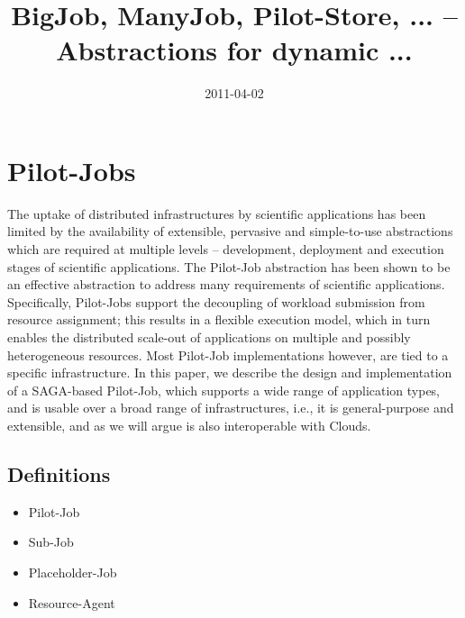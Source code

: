 \documentclass[]{article}
\title{BigJob, ManyJob, Pilot-Store, ... -- Abstractions for dynamic ...}
\author{  }
\date{2011-04-02}
\begin{document}
\ifpdf
{}
\else
{}
\fi

\maketitle


\section{Pilot-Jobs}

The uptake of distributed infrastructures by scientific applications has been
limited by the availability of extensible, pervasive and simple-to-use
abstractions which are required at multiple levels – development, deployment
and execution stages of scientific applications. The Pilot-Job abstraction has
been shown to be an effective abstraction to address many requirements of
scientific applications. Specifically, Pilot-Jobs support the decoupling of
workload submission from resource assignment; this results in a flexible
execution model, which in turn enables the distributed scale-out of
applications on multiple and possibly heterogeneous resources. Most Pilot-Job
implementations however, are tied to a specific infrastructure. In this paper,
we describe the design and implementation of a SAGA-based Pilot-Job, which
supports a wide range of application types, and is usable over a broad range
of infrastructures, i.e., it is general-purpose and extensible, and as we will
argue is also interoperable with Clouds.

\subsection{Definitions}

\begin{itemize}
	\item Pilot-Job
	\item Sub-Job
	\item Placeholder-Job
	\item Resource-Agent
\end{itemize}
\end{document}
